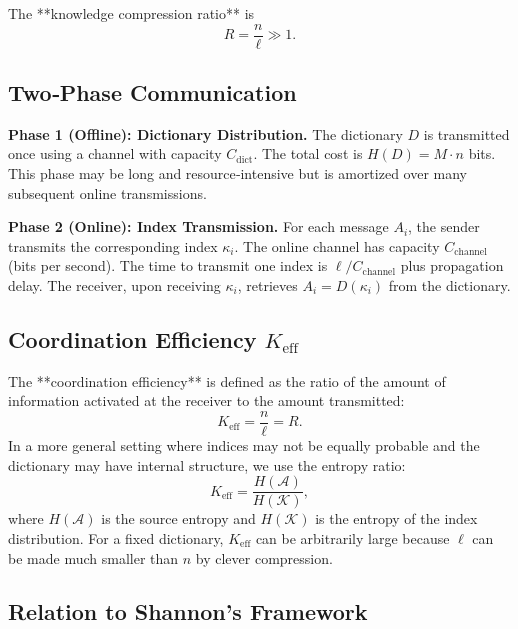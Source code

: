 \documentclass[12pt,a4paper]{article}
\theoremstyle{remark}
\newcommand{\Keff}{K_{\mathrm{eff}}}
\begin{document}
	The **knowledge compression ratio** is
	\begin{equation}
		R = \frac{n}{\ell} \gg 1.
	\end{equation}
	
	\subsection{Two‑Phase Communication}
	
	\textbf{Phase 1 (Offline): Dictionary Distribution.} The dictionary $D$ is transmitted once using a channel with capacity $C_{\text{dict}}$. The total cost is $H(D) = M \cdot n$ bits. This phase may be long and resource‑intensive but is amortized over many subsequent online transmissions.
	
	\textbf{Phase 2 (Online): Index Transmission.} For each message $A_i$, the sender transmits the corresponding index $\kappa_i$. The online channel has capacity $C_{\text{channel}}$ (bits per second). The time to transmit one index is $\ell / C_{\text{channel}}$ plus propagation delay. The receiver, upon receiving $\kappa_i$, retrieves $A_i = D(\kappa_i)$ from the dictionary.
	
	\subsection{Coordination Efficiency $\Keff$}
	\label{sec:keff-def}
	
	The **coordination efficiency** is defined as the ratio of the amount of information activated at the receiver to the amount transmitted:
	\begin{equation}
		\Keff = \frac{n}{\ell} = R. \label{eq:keff-def}
	\end{equation}
	In a more general setting where indices may not be equally probable and the dictionary may have internal structure, we use the entropy ratio:
	\begin{equation}
		\Keff = \frac{H(\mathcal{A})}{H(\mathcal{K})},
	\end{equation}
	where $H(\mathcal{A})$ is the source entropy and $H(\mathcal{K})$ is the entropy of the index distribution. For a fixed dictionary, $\Keff$ can be arbitrarily large because $\ell$ can be made much smaller than $n$ by clever compression.
	
	\subsection{Relation to Shannon's Framework}
	
\end{document}

